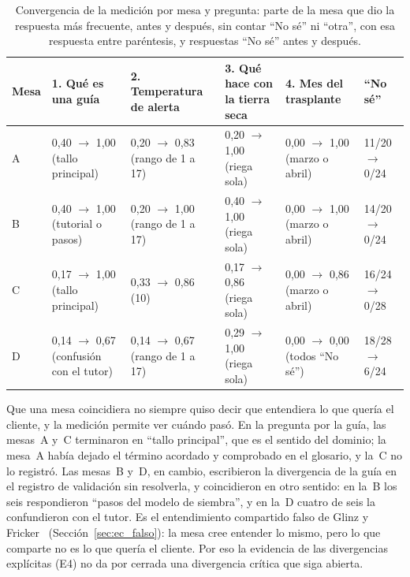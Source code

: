 \documentclass[12pt,letterpaper,oneside]{report}
\begin{document}
\begin{table}[H]
\caption{Convergencia de la medición por mesa y pregunta: parte de la mesa que
dio la respuesta más frecuente, antes y después, sin contar ``No sé'' ni
``otra'', con esa respuesta entre paréntesis, y respuestas ``No sé'' antes y
después.}
\label{tab:medicion_resultados}
\centering
\footnotesize
\renewcommand{\arraystretch}{1.15}
\begin{tabularx}{\textwidth}{@{}L{1.0cm} Y Y Y Y L{1.6cm}@{}}
\toprule
\textbf{Mesa} & \textbf{1. Qué es una guía} & \textbf{2. Temperatura de
alerta} & \textbf{3. Qué hace con la tierra seca} & \textbf{4. Mes del
trasplante} & \textbf{``No sé''} \\
\midrule
A & 0,40 $\to$ 1,00 (tallo principal) & 0,20 $\to$ 0,83 (rango de 1 a 17) &
0,20 $\to$ 1,00 (riega sola) & 0,00 $\to$ 1,00 (marzo o abril) & 11/20 $\to$
0/24 \\
B & 0,40 $\to$ 1,00 (tutorial o pasos) & 0,20 $\to$ 1,00 (rango de 1 a 17) &
0,40 $\to$ 1,00 (riega sola) & 0,00 $\to$ 1,00 (marzo o abril) & 14/20 $\to$
0/24 \\
C & 0,17 $\to$ 1,00 (tallo principal) & 0,33 $\to$ 0,86 (10) & 0,17 $\to$ 0,86
(riega sola) & 0,00 $\to$ 0,86 (marzo o abril) & 16/24 $\to$ 0/28 \\
D & 0,14 $\to$ 0,67 (confusión con el tutor) & 0,14 $\to$ 0,67 (rango de 1 a 17)
& 0,29 $\to$ 1,00 (riega sola) & 0,00 $\to$ 0,00 (todos ``No sé'') & 18/28
$\to$ 6/24 \\
\bottomrule
\end{tabularx}
\end{table}

Que una mesa coincidiera no siempre quiso decir que entendiera lo que quería el
cliente, y la medición permite ver cuándo pasó. En la pregunta por la guía, las
mesas~A y~C terminaron en ``tallo principal'', que es el sentido del dominio; la
mesa~A había dejado el término acordado y comprobado en el glosario, y la~C no
lo registró. Las mesas~B y~D, en cambio, escribieron la divergencia de la guía
en el registro de validación sin resolverla, y coincidieron en otro sentido: en
la~B los seis respondieron ``pasos del modelo de siembra'', y en la~D cuatro de
seis la confundieron con el tutor. Es el entendimiento compartido falso de Glinz
y Fricker~\cite{glinz2015shared} (Sección~\ref{sec:ec_falso}): la mesa cree
entender lo mismo, pero lo que comparte no es lo que quería el cliente. Por eso
la evidencia de las divergencias explícitas (E4) no da por cerrada una
divergencia crítica que siga abierta.
\end{document}
